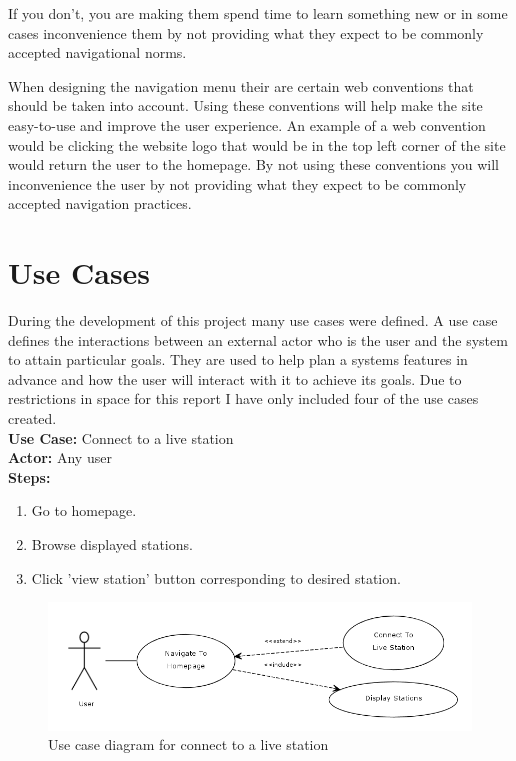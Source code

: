 \documentclass[a4paper, 12pt]{report}
\begin{document}
If you don’t, you are making them spend time to learn something new or in some cases inconvenience them by not providing what they expect to be commonly accepted navigational norms.

When designing the navigation menu their are certain web conventions\cite{web_design_conventions} that should be taken into account. Using these conventions will help make the site easy-to-use and improve the user experience. An example of a web convention would be clicking the website logo that would be in the top left corner of the site would return the user to the homepage. By not using these conventions you will inconvenience the user by not providing what they expect to be commonly accepted navigation practices.

\section{Use Cases}
During the development of this project many use cases were defined. A use case defines the interactions between an external actor who is the user and the system to attain particular goals. They are used to help plan a systems features in advance and how the user will interact with it to achieve its goals.
Due to restrictions in space for this report I have only included four of the use cases created.\\ 
\textbf{Use Case:} Connect to a live station\\
\textbf{Actor:} Any user\\
\textbf{Steps:}
\begin{enumerate}
\item Go to homepage.
\item Browse displayed stations.
\item Click 'view station' button corresponding to desired station.
\end{enumerate}
\begin{figure}[!htbp]
  \centering
    \includegraphics[width=1.0\textwidth]{usecase1.png}
    \caption{Use case diagram for connect to a live station}
\end{figure}
\end{document}

